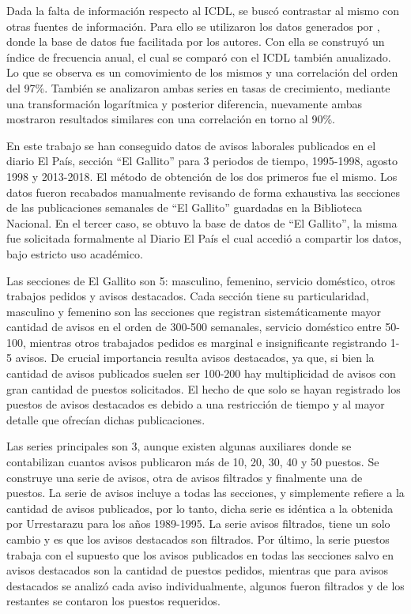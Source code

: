 Dada la falta de información respecto al ICDL, se buscó contrastar al mismo con otras fuentes de información. Para ello se utilizaron los datos generados por \cite{Alma2011}, donde la base de datos fue facilitada por los autores. Con ella se construyó un índice de frecuencia anual, el cual se comparó con el ICDL también anualizado. Lo que se observa es un comovimiento de los mismos y una correlación del orden del 97\%. También se analizaron ambas series en tasas de crecimiento, mediante una transformación logarítmica y posterior diferencia, nuevamente ambas mostraron resultados similares con una correlación en torno al 90\%.

En este trabajo se han conseguido datos de avisos laborales publicados en el diario El País, sección ``El Gallito'' para 3 periodos de tiempo, 1995-1998, agosto 1998 y 2013-2018. El método de obtención de los dos primeros fue el mismo. Los datos fueron recabados manualmente revisando de forma exhaustiva las secciones de las publicaciones semanales de ``El Gallito'' guardadas en la Biblioteca Nacional. En el tercer caso, se obtuvo la base de datos de ``El Gallito'', la misma fue solicitada formalmente al Diario El País el cual accedió a compartir los datos, bajo estricto uso académico.

Las secciones de El Gallito son 5: masculino, femenino, servicio doméstico, otros trabajos pedidos y avisos destacados. Cada sección tiene su particularidad, masculino y femenino son las secciones que registran sistemáticamente mayor cantidad de avisos en el orden de 300-500 semanales, servicio doméstico entre 50-100, mientras otros trabajados pedidos es marginal e insignificante registrando 1-5 avisos. De crucial importancia resulta avisos destacados, ya que, si bien la cantidad de avisos publicados suelen ser 100-200 hay multiplicidad de avisos con gran cantidad de puestos solicitados. El hecho de que solo se hayan registrado los puestos de avisos destacados es debido a una restricción de tiempo y al mayor detalle que ofrecían dichas publicaciones.

Las series principales son 3, aunque existen algunas auxiliares donde se contabilizan cuantos avisos publicaron más de 10, 20, 30, 40 y 50 puestos. Se construye una serie de avisos, otra de avisos filtrados y finalmente una de puestos. La serie de avisos incluye a todas las secciones, y simplemente refiere a la cantidad de avisos publicados, por lo tanto, dicha serie es idéntica a la obtenida por Urrestarazu para los años 1989-1995. La serie avisos filtrados, tiene un solo cambio y es que los avisos destacados son filtrados. Por último, la serie puestos trabaja con el supuesto que los avisos publicados en todas las secciones salvo en avisos destacados son la cantidad de puestos pedidos, mientras que para avisos destacados se analizó cada aviso individualmente, algunos fueron filtrados y de los restantes se contaron los puestos requeridos.

